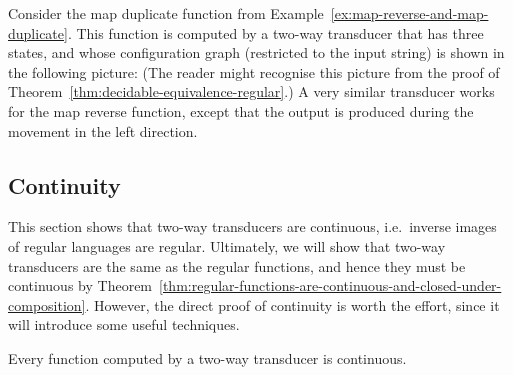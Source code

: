 \begin{myexample}\label{ex:map-duplicate-reverse-two-way}
    Consider the map duplicate function from Example~\ref{ex:map-reverse-and-map-duplicate}. This function is computed by a two-way transducer that  has three states, and whose configuration graph (restricted to the input string) is shown in the following picture:
    (The reader might recognise this picture from the proof of Theorem~\ref{thm:decidable-equivalence-regular}.)
    A very similar transducer works for the map reverse function, except that the output is produced during the movement in the left direction.
\end{myexample}

\subsection{Continuity} 
\label{sec:2dfa-continuity}
This section shows that two-way transducers are continuous, i.e.~inverse images of regular languages are regular. Ultimately, we will show that two-way transducers are the same as the regular functions, and hence they must be  continuous by Theorem~\ref{thm:regular-functions-are-continuous-and-closed-under-composition}. However, the direct proof  of continuity is worth the effort, since it will introduce some useful techniques.
\begin{theorem}\label{thm:continuity-2dfas}
    Every function computed by a two-way transducer is continuous.
\end{theorem}
